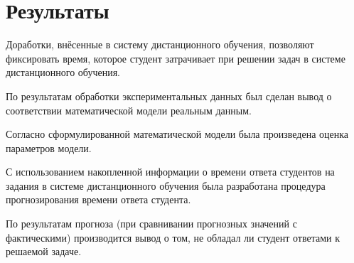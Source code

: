  \chapter{Результаты}
 \label{ch5}

Доработки, внёсенные в систему дистанционного обучения, позволяют фиксировать время, которое студент затрачивает при решении задач в системе дистанционного обучения.

По результатам обработки экспериментальных данных был сделан вывод о соответствии математической модели реальным данным.

Согласно сформулированной математической модели была произведена оценка параметров модели.

С использованием накопленной информации о времени ответа студентов на задания в системе дистанционного обучения была разработана процедура прогнозирования времени ответа студента.

По результатам прогноза (при сравнивании прогнозных значений с фак\-тическими) производится вывод о том, не обладал ли студент ответами к решаемой задаче.
